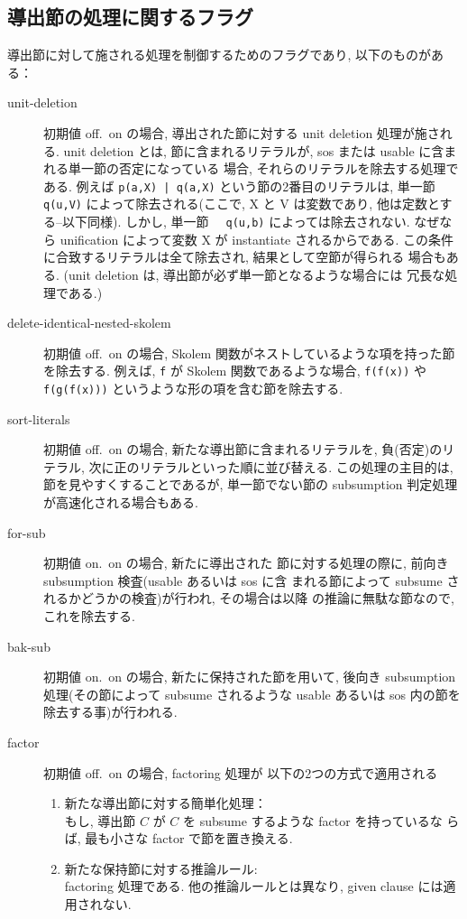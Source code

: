 \subsection{導出節の処理に関するフラグ}
\label{sec:gen-flags}
導出節に対して施される処理を制御するためのフラグであり,
以下のものがある：
\begin{description}
\item[unit-deletion] 初期値 off.\ on の場合,
  導出された節に対する unit deletion 処理が施される.
  unit deletion とは, 節に含まれるリテラルが,
  sos または usable に含まれる単一節の否定になっている
  場合, それらのリテラルを除去する処理である.
  例えば \texttt{p(a,X) | q(a,X)} という節の2番目のリテラルは,
  単一節 \texttt{~ q(u,V)} によって除去される(ここで, X と V は変数であり,
  他は定数とする--以下同様).
  しかし, 単一節 \texttt{~ q(u,b)} によっては除去されない. 
  なぜなら unification によって変数 X が instantiate されるからである.
  この条件に合致するリテラルは全て除去され, 結果として空節が得られる
  場合もある. (unit deletion は, 導出節が必ず単一節となるような場合には
  冗長な処理である.)

\item[delete-identical-nested-skolem] 初期値 off.\ on の場合,
  Skolem 関数がネストしているような項を持った節を除去する.
  例えば, \texttt{f} が Skolem 関数であるような場合, \texttt{f(f(x))}
  や \texttt{f(g(f(x)))} というような形の項を含む節を除去する.

\item[sort-literals] 初期値 off.\ on の場合,
  新たな導出節に含まれるリテラルを, 負(否定)のリテラル,
  次に正のリテラルといった順に並び替える. 
  この処理の主目的は, 節を見やすくすることであるが,
  単一節でない節の subsumption 判定処理が高速化される場合もある.

\item[for-sub] 初期値 on.\ on の場合, 新たに導出された
  節に対する処理の際に, 前向き subsumption 検査(usable あるいは sos に含
  まれる節によって subsume されるかどうかの検査)が行われ, その場合は以降
  の推論に無駄な節なので, これを除去する. 

\item[bak-sub] 初期値 on.\ on の場合, 新たに保持された節を用いて, 後向き
  subsumption 処理(その節によって  subsume されるような usable あるいは
  sos 内の節を除去する事)が行われる.

\item[factor] 初期値 off.\ on の場合, factoring 処理が
  以下の2つの方式で適用される
  \begin{enumerate}
  \item 新たな導出節に対する簡単化処理：\\
    もし, 導出節 $C$ が $C$ を subsume するような factor を持っているな
    らば, 最も小さな factor で節を置き換える.
  \item 新たな保持節に対する推論ルール:\\
    factoring 処理である. 他の推論ルールとは異なり, given clause には適
    用されない. 
  \end{enumerate}
\end{description}

